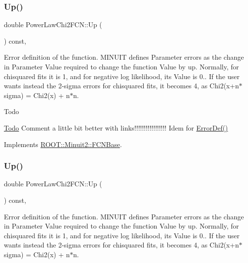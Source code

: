 \subsubsection{\texorpdfstring{Up()}{Up()}\hspace{0.1cm}{\footnotesize\ttfamily [1/2]}}
{\footnotesize\ttfamily double Power\+Law\+Chi2\+F\+C\+N\+::\+Up (\begin{DoxyParamCaption}{ }\end{DoxyParamCaption}) const\hspace{0.3cm}{\ttfamily [inline]}, {\ttfamily [virtual]}}

Error definition of the function. M\+I\+N\+U\+IT defines Parameter errors as the change in Parameter Value required to change the function Value by up. Normally, for chisquared fits it is 1, and for negative log likelihood, its Value is 0.. If the user wants instead the 2-\/sigma errors for chisquared fits, it becomes 4, as Chi2(x+n$\ast$sigma) = Chi2(x) + n$\ast$n.

\begin{DoxyRefDesc}{Todo}
\item[\mbox{\hyperlink{todo__todo000001}{Todo}}]Comment a little bit better with links!!!!!!!!!!!!!!!!! Idem for \mbox{\hyperlink{classROOT_1_1Minuit2_1_1FCNBase_ac4592475c58a65b037ba97ab5f3cba10}{Error\+Def()}}\end{DoxyRefDesc}


Implements \mbox{\hyperlink{classROOT_1_1Minuit2_1_1FCNBase_a04ef08ddad92ce8d89d498efbe021c39}{R\+O\+O\+T\+::\+Minuit2\+::\+F\+C\+N\+Base}}.

\mbox{\label{classPowerLawChi2FCN_ad202014937fe0e66dffc0fa9061ca9df}} 
\subsubsection{\texorpdfstring{Up()}{Up()}\hspace{0.1cm}{\footnotesize\ttfamily [2/2]}}
{\footnotesize\ttfamily double Power\+Law\+Chi2\+F\+C\+N\+::\+Up (\begin{DoxyParamCaption}{ }\end{DoxyParamCaption}) const\hspace{0.3cm}{\ttfamily [inline]}, {\ttfamily [virtual]}}

Error definition of the function. M\+I\+N\+U\+IT defines Parameter errors as the change in Parameter Value required to change the function Value by up. Normally, for chisquared fits it is 1, and for negative log likelihood, its Value is 0.. If the user wants instead the 2-\/sigma errors for chisquared fits, it becomes 4, as Chi2(x+n$\ast$sigma) = Chi2(x) + n$\ast$n.

